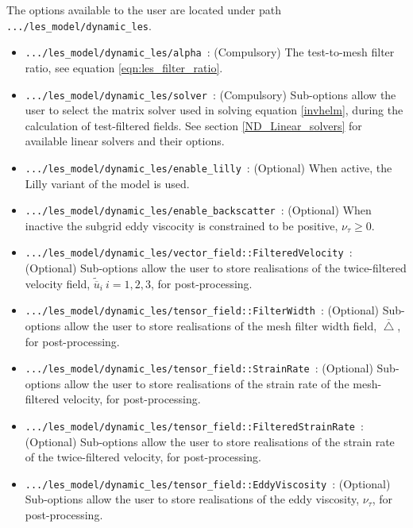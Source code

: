 \par
The options available to the user are located under path \lstinline+.../les_model/dynamic_les+.
\begin{itemize}
  \item \lstinline+.../les_model/dynamic_les/alpha+\ : (Compulsory) The test-to-mesh filter ratio,
        see equation \eqref{eqn:les_filter_ratio}.
  \item \lstinline+.../les_model/dynamic_les/solver+\ : (Compulsory) Sub-options allow the user to
        select the matrix solver used in solving equation \eqref{invhelm}, during the calculation
        of test-filtered fields. See section \ref{ND_Linear_solvers} for available
        linear solvers and their options.
  \item \lstinline+.../les_model/dynamic_les/enable_lilly+\ : (Optional) When active, the Lilly
        variant of the model is used.
  \item \lstinline+.../les_model/dynamic_les/enable_backscatter+\ : (Optional) When inactive the
        subgrid eddy viscocity is constrained to be positive, $\nu_\tau \geq 0$.
  \item \lstinline+.../les_model/dynamic_les/vector_field::FilteredVelocity+\ : (Optional)
        Sub-options allow the user to store realisations of the twice-filtered velocity field,
        $\tilde{\overline{u}}_i\ i=1,2,3$, for post-processing.
  \item \lstinline+.../les_model/dynamic_les/tensor_field::FilterWidth+\ : (Optional)
        Sub-options allow the user to store realisations of the mesh filter width field,
        $\overline \bigtriangleup$, for post-processing.
  \item \lstinline+.../les_model/dynamic_les/tensor_field::StrainRate+\ : (Optional)
        Sub-options allow the user to store realisations of the strain rate of the mesh-filtered
        velocity, for post-processing.
  \item \lstinline+.../les_model/dynamic_les/tensor_field::FilteredStrainRate+\ : (Optional)
        Sub-options allow the user to store realisations of the strain rate of the twice-filtered
        velocity, for post-processing.
  \item \lstinline+.../les_model/dynamic_les/tensor_field::EddyViscosity+\ : (Optional)
        Sub-options allow the user to store realisations of the eddy viscosity, $\nu_\tau$,
        for post-processing.
\end{itemize}

